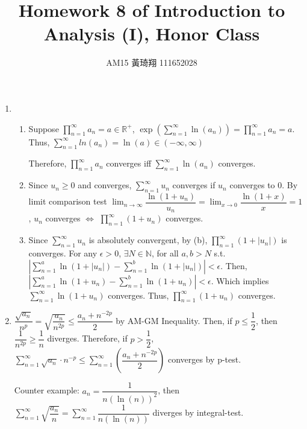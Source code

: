 \documentclass[12pt]{article}
\title{Homework 8 of Introduction to Analysis (I), Honor Class}
\author{AM15 黃琦翔 111652028}
\begin{document}
\maketitle
\begin{enumerate}
    \item\begin{enumerate}
        \item Suppose $\displaystyle\prod_{n=1}^{\infty} a_n = a \in \mathbb{R}^+$, 
        $\exp(\displaystyle\sum_{n=1}^{\infty} \ln(a_n)) = \displaystyle\prod_{n=1}^{\infty} a_n = a$.
        Thus, $\displaystyle\sum_{n=1}^{\infty} ln(a_n) = \ln(a)\in (-\infty, \infty)$

        Therefore, $\displaystyle\prod_{n=1}^{\infty} a_n$ converges iff $\displaystyle\sum_{n=1}^{\infty} \ln(a_n)$ converges.

        \item Since $u_n\geq 0$ and converges, $\displaystyle\sum_{n=1}^{\infty} u_n$ converges if $u_n$ converges to $0$.
        By limit comparison test $\displaystyle\lim_{n\to\infty} \dfrac{\ln(1 + u_n)}{u_n} = \displaystyle\lim_{x\to 0} \dfrac{\ln(1+x)}{x} = 1$,
        $u_n$ converges $\iff$ $\displaystyle\prod_{n=1}^{\infty} (1 + u_n)$ converges.

        \item Since $\displaystyle\sum_{n=1}^{\infty}u_n$ is absolutely convergent, by (b), $\displaystyle\prod_{n=1}^{\infty} (1 + |u_n|)$ is converges.
        For any $\epsilon > 0$, $\exists N \in \mathbb{N}$, for all $a, b> N$ s.t. $|\displaystyle\sum_{n=1}^{a} \ln(1+|u_n|) - \displaystyle\sum_{n=1}^{b}\ln(1 + |u_n|)| < \epsilon$.
        Then, $|\displaystyle\sum_{n=1}^{a} \ln(1 + u_n) - \displaystyle\sum_{n=1}^{b} \ln(1 + u_n)| < \epsilon$. Which implies $\displaystyle\sum_{n=1}^{\infty} \ln(1 + u_n)$ converges.
        Thus, $\displaystyle\prod_{n=1}^{\infty} (1 + u_n)$ converges.
    \end{enumerate}

    \item $\dfrac{\sqrt{a_n}}{n^p}  = \sqrt{\dfrac{a_n}{n^{2p}}} \leq \dfrac{a_n + n^{-2p}}{2}$ by AM-GM Inequality.
    Then, if $p\leq \dfrac{1}{2}$, then $\dfrac{1}{n^{2p}} \geq \dfrac{1}{n}$ diverges.
    Therefore, if $p > \dfrac{1}{2}$, $\displaystyle\sum_{n=1}^{\infty} \sqrt{a_n} \cdot n^{-p} \leq \displaystyle\sum_{n=1}^{\infty} (\dfrac{a_n + n^{-2p}}{2})$ converges by p-test.

    Counter example: $a_n = \dfrac{1}{n (\ln(n))^2}$, then $\displaystyle\sum_{n=1}^{\infty}\sqrt{\dfrac{a_n}{n}} = \displaystyle\sum_{n=1}^{\infty} \dfrac{1}{n(\ln(n))}$ diverges by integral-test. 
    \end{enumerate}
\end{document}
